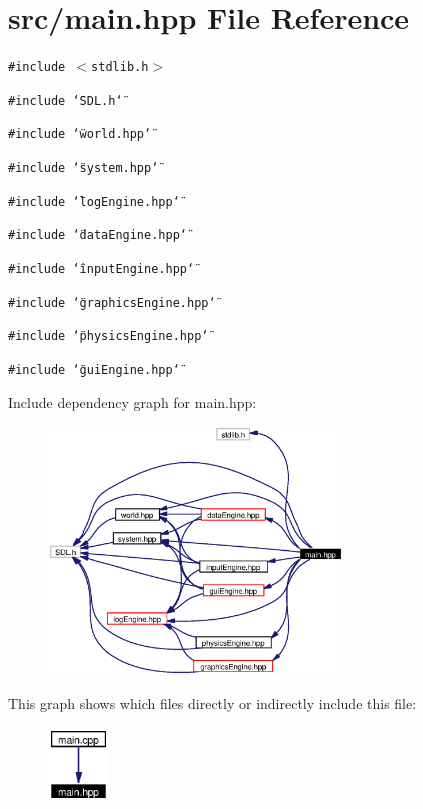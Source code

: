 \section{src/main.hpp File Reference}
\label{main_8hpp}
{\tt \#include $<$stdlib.h$>$}\par
{\tt \#include \char`\"{}SDL.h\char`\"{}}\par
{\tt \#include \char`\"{}world.hpp\char`\"{}}\par
{\tt \#include \char`\"{}system.hpp\char`\"{}}\par
{\tt \#include \char`\"{}log\-Engine.hpp\char`\"{}}\par
{\tt \#include \char`\"{}data\-Engine.hpp\char`\"{}}\par
{\tt \#include \char`\"{}input\-Engine.hpp\char`\"{}}\par
{\tt \#include \char`\"{}graphics\-Engine.hpp\char`\"{}}\par
{\tt \#include \char`\"{}physics\-Engine.hpp\char`\"{}}\par
{\tt \#include \char`\"{}gui\-Engine.hpp\char`\"{}}\par


Include dependency graph for main.hpp:\begin{figure}[H]
\begin{center}
\leavevmode
\includegraphics[width=221pt]{main_8hpp__incl}
\end{center}
\end{figure}


This graph shows which files directly or indirectly include this file:\begin{figure}[H]
\begin{center}
\leavevmode
\includegraphics[width=46pt]{main_8hpp__dep__incl}
\end{center}
\end{figure}
